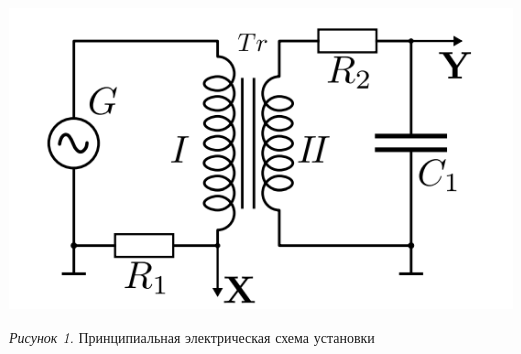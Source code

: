 \hypertarget{schema}{}

\begin{center}
    \includegraphics[width=15cm]{images/scheme1}

    \smallvspace

    \textit{Рисунок 1.} Принципиальная электрическая схема установки
\end{center}




